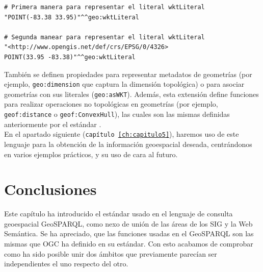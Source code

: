 \vspace*{0.2cm}

\begin{lstlisting}
# Primera manera para representar el literal wktLiteral
"POINT(-83.38 33.95)"^^geo:wktLiteral

# Segunda manear para representar el literal wktLiteral
"<http://www.opengis.net/def/crs/EPSG/0/4326>
POINT(33.95 -83.38)"^^geo:wktLiteral
\end{lstlisting}



\vspace*{0.2cm}

También se definen propiedades para representar metadatos de geometrías (por ejemplo, \texttt{geo:dimension} que captura la dimensión topológica) o para asociar geometrías con sus literales (\texttt{geo:asWKT}). Además, esta extensión define funciones para realizar operaciones no topológicas en geometrías (por ejemplo, \texttt{geof:distance} o \texttt{geof:ConvexHull}), las cuales son las mismas definidas anteriormente por el estándar \cite{wkt-database}.\\


En el apartado siguiente (\texttt{capítulo \ref{ch:capitulo5}}), haremos uso de este lenguaje para la obtención de la información geoespacial deseada, centrándonos en varios ejemplos prácticos, y su uso de cara al futuro.

\section{Conclusiones}

Este capítulo ha introducido el estándar usado en el lenguaje de consulta geoespacial GeoSPARQL, como nexo de unión de las áreas de los SIG y la Web Semántica. Se ha apreciado, que las funciones usadas en el GeoSPARQL son las mismas que OGC ha definido en su estándar. Con esto acabamos de comprobar como ha sido posible unir dos ámbitos que previamente parecían ser independientes el uno respecto del otro.